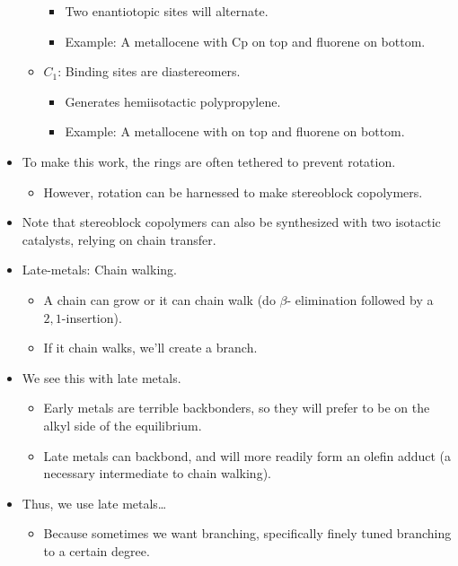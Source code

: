\documentclass[../notes.tex]{subfiles}
\begin{document}
\begin{itemize}
\begin{itemize}
\begin{itemize}
            \item Two enantiotopic sites will alternate.
            \item Example: A metallocene with Cp on top and fluorene on bottom.
        \end{itemize}
        \item $C_1$: Binding sites are diastereomers.
        \begin{itemize}
            \item Generates hemiisotactic polypropylene.
            \item Example: A metallocene with  on top and fluorene on bottom.
        \end{itemize}
    \end{itemize}
    \item To make this work, the  rings are often tethered to prevent rotation.
    \begin{itemize}
        \item However, rotation can be harnessed to make stereoblock copolymers.
    \end{itemize}
    \item Note that stereoblock copolymers can also be synthesized with two isotactic catalysts, relying on chain transfer.
    \item Late-metals: Chain walking.
    \begin{itemize}
        \item A chain can grow or it can chain walk (do $\beta$- elimination followed by a $2,1$-insertion).
        \item If it chain walks, we'll create a branch.
    \end{itemize}
    \item We see this with late metals.
    \begin{itemize}
        \item Early metals are terrible backbonders, so they will prefer to be on the alkyl side of the equilibrium.
        \item Late metals can backbond, and will more readily form an olefin adduct (a necessary intermediate to chain walking).
    \end{itemize}
    \item Thus, we use late metals\dots
    \begin{itemize}
        \item Because sometimes we want branching, specifically finely tuned branching to a certain degree.
        \begin{itemize}

\end{itemize}
\end{itemize}
\end{itemize}
\end{document}
